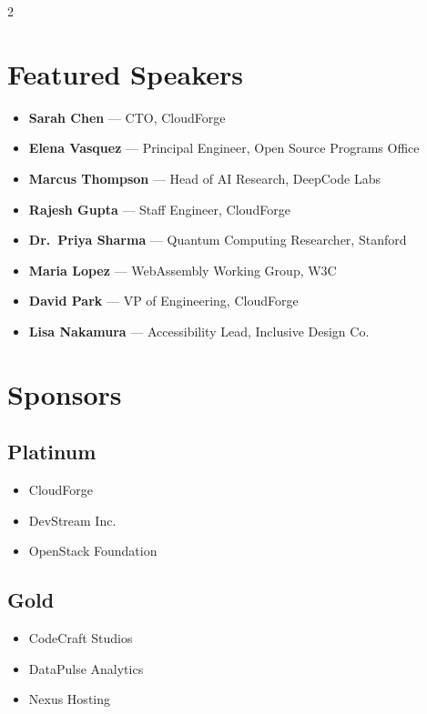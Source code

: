 \documentclass[
    language=english,
    doctype=program,
    institution=none,
]{../../omnilatex}
\begin{document}
\begin{multicols}{2}

\section*{Featured Speakers}

\begin{itemize}[leftmargin=*, nosep]
    \item \textbf{Sarah Chen} --- CTO, CloudForge
    \item \textbf{Elena Vasquez} --- Principal Engineer, Open Source Programs Office
    \item \textbf{Marcus Thompson} --- Head of AI Research, DeepCode Labs
    \item \textbf{Rajesh Gupta} --- Staff Engineer, CloudForge
    \item \textbf{Dr.\ Priya Sharma} --- Quantum Computing Researcher, Stanford
    \item \textbf{Maria Lopez} --- WebAssembly Working Group, W3C
    \item \textbf{David Park} --- VP of Engineering, CloudForge
    \item \textbf{Lisa Nakamura} --- Accessibility Lead, Inclusive Design Co.
\end{itemize}

\columnbreak

\section*{Sponsors}

\subsection*{Platinum}
\begin{itemize}[leftmargin=*, nosep]
    \item CloudForge
    \item DevStream Inc.
    \item OpenStack Foundation
\end{itemize}

\subsection*{Gold}
\begin{itemize}[leftmargin=*, nosep]
    \item CodeCraft Studios
    \item DataPulse Analytics
    \item Nexus Hosting
\end{itemize}


\end{multicols}
\end{document}
